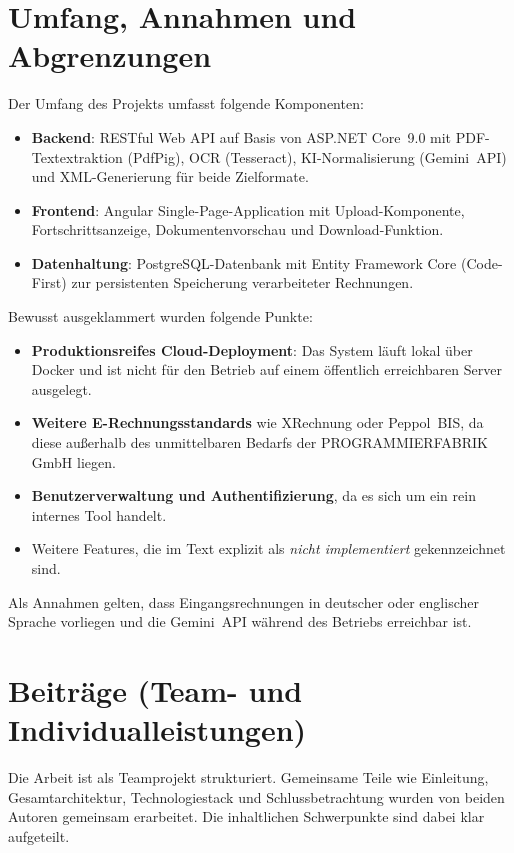 \section{Umfang, Annahmen und Abgrenzungen}
Der Umfang des Projekts umfasst folgende Komponenten:

\begin{itemize}
    \item \textbf{Backend}: RESTful Web API auf Basis von ASP.NET Core~9.0 mit
    PDF-Textextraktion (PdfPig), OCR (Tesseract), KI-Normalisierung (Gemini~API)
    und XML-Generierung für beide Zielformate.
    \item \textbf{Frontend}: Angular Single-Page-Application mit Upload-Komponente,
    Fortschrittsanzeige, Dokumentenvorschau und Download-Funktion.
    \item \textbf{Datenhaltung}: PostgreSQL-Datenbank mit Entity Framework Core (Code-First)
    zur persistenten Speicherung verarbeiteter Rechnungen.
\end{itemize}

Bewusst ausgeklammert wurden folgende Punkte:

\begin{itemize}
    \item \textbf{Produktionsreifes Cloud-Deployment}: Das System läuft lokal über Docker
    und ist nicht für den Betrieb auf einem öffentlich erreichbaren Server ausgelegt.
    \item \textbf{Weitere E-Rechnungsstandards} wie XRechnung oder Peppol~BIS,
    da diese außerhalb des unmittelbaren Bedarfs der PROGRAMMIERFABRIK GmbH liegen.
    \item \textbf{Benutzerverwaltung und Authentifizierung}, da es sich um ein rein
    internes Tool handelt.
    \item Weitere Features, die im Text explizit als \textit{nicht implementiert}
    gekennzeichnet sind.
\end{itemize}

Als Annahmen gelten, dass Eingangsrechnungen in deutscher oder englischer Sprache vorliegen
und die Gemini~API während des Betriebs erreichbar ist.

\section{Beiträge (Team- und Individualleistungen)}
Die Arbeit ist als Teamprojekt strukturiert. Gemeinsame Teile wie Einleitung,
Gesamtarchitektur, Technologiestack und Schlussbetrachtung wurden von beiden Autoren
gemeinsam erarbeitet. Die inhaltlichen Schwerpunkte sind dabei klar aufgeteilt.

